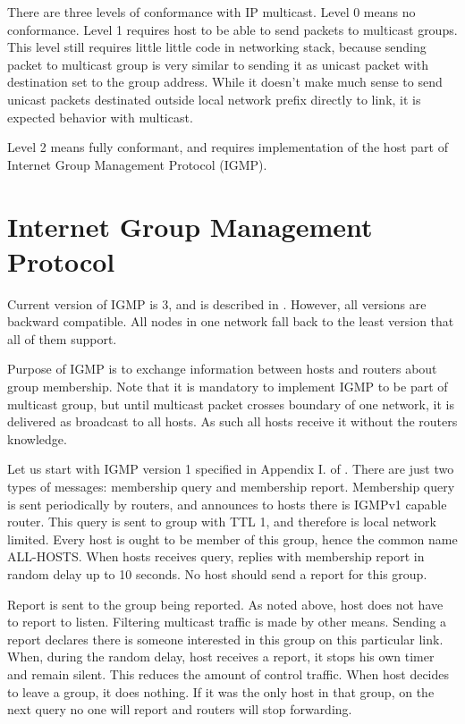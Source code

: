 There are three levels of conformance with IP multicast. Level 0 means no
conformance. Level 1 requires host to be able to send packets to multicast
groups. This level still requires little little code in networking stack, because
sending packet to multicast group is very similar to sending it as unicast
packet with destination set to the group address. While it doesn't make much
sense to send unicast packets destinated outside local network prefix directly
to link, it is expected behavior with multicast.

Level 2 means fully conformant, and requires implementation of the host part of
Internet Group Management Protocol (IGMP).

\section{Internet Group Management Protocol}

Current version of IGMP is 3, and is described in . However, all
versions are backward compatible. All nodes in one network fall back to the
least version that all of them support.

Purpose of IGMP is to exchange information between hosts and routers about
group membership. Note that it is mandatory to implement IGMP to be part of
multicast group, but until multicast packet crosses boundary of one network, it
is delivered as broadcast to all hosts. As such all hosts receive it without
the routers knowledge.

Let us start with IGMP version 1 specified in Appendix I. of . There
are just two types of messages: membership query and membership report.
Membership query is sent periodically by routers, and announces to hosts there
is IGMPv1 capable router. This query is sent to group  with TTL
1, and therefore is local network limited. Every host is ought to be member of
this group, hence the common name ALL-HOSTS. When hosts receives query, replies
with membership report in random delay up to 10 seconds. No host should send
a report for this group.

Report is sent to the group being reported. As noted above, host does not have
to report to listen. Filtering multicast traffic is made by other means.
Sending a report declares there is someone interested in this group on this
particular link. When, during the random delay, host receives a report, it
stops his own timer and remain silent. This reduces the amount of control
traffic. When host decides to leave a group, it does nothing. If it was the
only host in that group, on the next query no one will report and routers will
stop forwarding.

